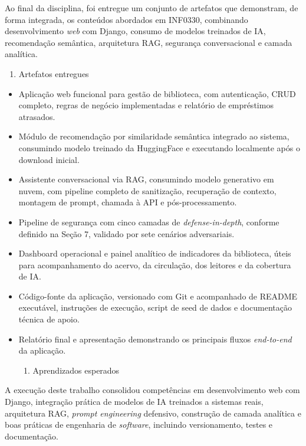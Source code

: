 \documentclass[
]{article}
\begin{document}
Ao final da disciplina, foi entregue um conjunto de artefatos que
demonstram, de forma integrada, os conteúdos abordados em INF0330,
combinando desenvolvimento \emph{web} com Django, consumo de modelos
treinados de IA, recomendação semântica, arquitetura RAG, segurança
conversacional e camada analítica.

\begin{enumerate}
\def\labelenumi{\arabic{enumi}.}
\item
  \protect{}\label{_Toc230227834}{}Artefatos entregues
\end{enumerate}

\begin{itemize}
\item
  Aplicação web funcional para gestão de biblioteca, com autenticação,
  CRUD completo, regras de negócio implementadas e relatório de
  empréstimos atrasados.
\item
  Módulo de recomendação por similaridade semântica integrado ao
  sistema, consumindo modelo treinado da HuggingFace e executando
  localmente após o download inicial.
\item
  Assistente conversacional via RAG, consumindo modelo generativo em
  nuvem, com pipeline completo de sanitização, recuperação de contexto,
  montagem de prompt, chamada à API e pós-processamento.
\item
  Pipeline de segurança com cinco camadas de \emph{defense-in-depth},
  conforme definido na Seção 7, validado por sete cenários adversariais.
\item
  Dashboard operacional e painel analítico de indicadores da biblioteca,
  úteis para acompanhamento do acervo, da circulação, dos leitores e da
  cobertura de IA.
\item
  Código-fonte da aplicação, versionado com Git e acompanhado de README
  executável, instruções de execução, script de seed de dados e
  documentação técnica de apoio.
\item
  Relatório final e apresentação demonstrando os principais fluxos
  \emph{end-to-end} da aplicação.

  \begin{enumerate}
  \def\labelenumi{\arabic{enumi}.}
  \item
    \protect{}\label{_Toc230227835}{}Aprendizados esperados
  \end{enumerate}
\end{itemize}

A execução deste trabalho consolidou competências em desenvolvimento web
com Django, integração prática de modelos de IA treinados a sistemas
reais, arquitetura RAG, \emph{prompt engineering} defensivo, construção
de camada analítica e boas práticas de engenharia de \emph{software},
incluindo versionamento, testes e documentação.
\end{document}
